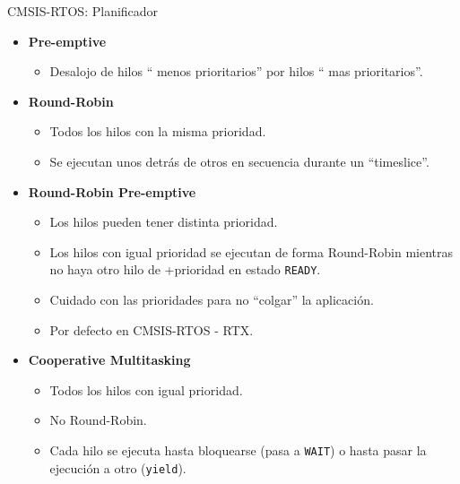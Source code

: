 \begin{frame}{CMSIS-RTOS: Planificador}
    \begin{itemize}
      \item \textbf{Pre-emptive}
          \begin{itemize}
            \item Desalojo de hilos “ menos prioritarios” por hilos “ mas prioritarios”.
          \end{itemize}
      \item \textbf{Round-Robin}
          \begin{itemize}
            \item Todos los hilos con la misma prioridad.
            \item Se ejecutan unos detrás de otros en secuencia durante un “timeslice”.
      \end{itemize}
      \item \textbf{Round-Robin Pre-emptive}
          \begin{itemize}
            \item Los hilos pueden tener distinta prioridad.
            \item Los hilos con igual prioridad se ejecutan de forma Round-Robin mientras no haya otro hilo de +prioridad en estado \texttt{READY}.
            \item Cuidado con las prioridades para no “colgar” la aplicación.
            \item Por defecto en CMSIS-RTOS - RTX.
      \end{itemize}
      \item \textbf{Cooperative Multitasking}
          \begin{itemize}
            \item Todos los hilos con igual prioridad.
            \item No Round-Robin.
            \item Cada hilo se ejecuta hasta bloquearse (pasa a \texttt{WAIT}) o hasta pasar la ejecución a otro (\texttt{yield}).
          \end{itemize}
    \end{itemize}
\end{frame}


